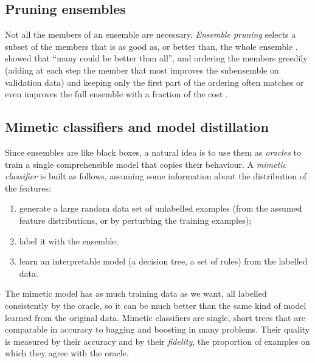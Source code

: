 \subsection{Pruning ensembles\extsec}

Not all the members of an ensemble are necessary. \emph{Ensemble pruning} selects a subset of the
members that is as good as, or better than, the whole ensemble \citep{margineantu1997pruning}.
\citet{zhou2002ensembling} showed that ``many could be better than all'', and ordering the members
greedily (adding at each step the member that most improves the subensemble on validation data)
and keeping only the first part of the ordering often matches or even improves the full ensemble
with a fraction of the cost \citep{martinezmunoz2009analysis}.

\subsection{Mimetic classifiers and model distillation\extsec}

Since ensembles are like black boxes, a natural idea is to use them as \emph{oracles} to train a
single comprehensible model that copies their behaviour. A \emph{mimetic classifier}
\citep{domingos1997knowledge,estruch2003simple} is built as follows, assuming some information
about the distribution of the features:
\begin{enumerate}
  \item generate a large random data set of unlabelled examples (from the assumed feature
        distributions, or by perturbing the training examples);
  \item label it with the ensemble;
  \item learn an interpretable model (a decision tree, a set of rules) from the labelled data.
\end{enumerate}
The mimetic model has as much training data as we want, all labelled consistently by the oracle,
so it can be much better than the same kind of model learned from the original data. Mimetic
classifiers are single, short trees that are comparable in accuracy to bagging and boosting in
many problems. Their quality is measured by their accuracy and by their \emph{fidelity}, the
proportion of examples on which they agree with the oracle.

